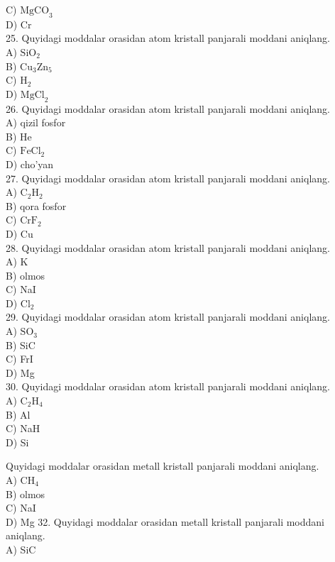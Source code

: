 C) $\mathrm{MgCO}_{3}$\\
D) Cr\\
25. Quyidagi moddalar orasidan atom kristall panjarali moddani aniqlang.\\
A) $\mathrm{SiO}_{2}$\\
B) $\mathrm{Cu}_{3} \mathrm{Zn}_{5}$\\
C) $\mathrm{H}_{2}$\\
D) $\mathrm{MgCl}_{2}$\\
26. Quyidagi moddalar orasidan atom kristall panjarali moddani aniqlang.\\
A) qizil fosfor\\
B) He\\
C) $\mathrm{FeCl}_{2}$\\
D) cho'yan\\
27. Quyidagi moddalar orasidan atom kristall panjarali moddani aniqlang.\\
A) $\mathrm{C}_{2} \mathrm{H}_{2}$\\
B) qora fosfor\\
C) $\mathrm{CrF}_{2}$\\
D) Cu\\
28. Quyidagi moddalar orasidan atom kristall panjarali moddani aniqlang.\\
A) K\\
B) olmos\\
C) NaI\\
D) $\mathrm{Cl}_{2}$\\
29. Quyidagi moddalar orasidan atom kristall panjarali moddani aniqlang.\\
A) $\mathrm{SO}_{3}$\\
B) SiC\\
C) FrI\\
D) Mg\\
30. Quyidagi moddalar orasidan atom kristall panjarali moddani aniqlang.\\
A) $\mathrm{C}_{2} \mathrm{H}_{4}$\\
B) Al\\
C) NaH\\
D) Si
  \item Quyidagi moddalar orasidan metall kristall panjarali moddani aniqlang.\\
A) $\mathrm{CH}_{4}$\\
B) olmos\\
C) NaI\\
D) Mg
32. Quyidagi moddalar orasidan metall kristall panjarali moddani aniqlang.\\
A) SiC\\
